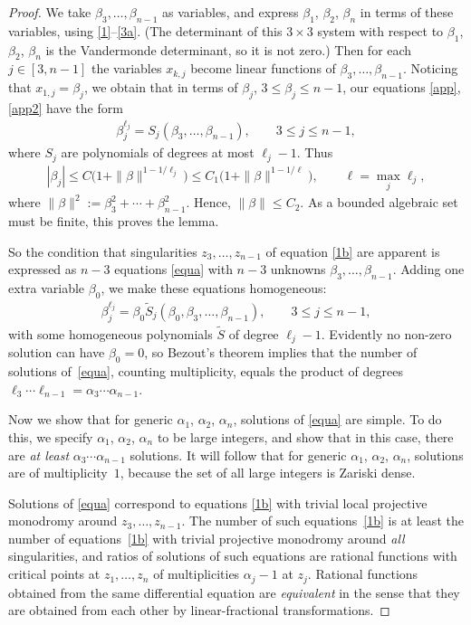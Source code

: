 \documentclass[pdftex]{sigma}
\numberwithin{equation}{section}
\def\lc{,\allowbreak\ldots,\allowbreak}
\begin{document}
\begin{proof} We take $\beta_3\lc\beta_{n-1}$ as variables, and express $\beta_1$, $\beta_2$, $\beta_n$ in terms of these variables, using \eqref{1}--\eqref{3a}. (The determinant of this $3\times3$ system with respect to $\beta_1$, $\beta_2$, $\beta_n$ is the Vandermonde determinant, so it is not zero.) Then for each $j\in[3,n-1]$ the variables $x_{k,j}$ become linear functions of $\beta_3\lc\beta_{n-1}$. Noticing that $x_{1,j}=\beta_j$, we obtain that in terms of $\beta_j$, $3\leq\beta_j\leq n-1$, our equations \eqref{app}, \eqref{app2} have the form
\begin{gather}\label{equa}
\beta_j^{\ell_j}=S_j(\beta_3\lc\beta_{n-1}),\qquad 3\leq j\leq n-1,
\end{gather}
where $S_j$ are polynomials of degrees at most $\ell_j-1$. Thus
\begin{gather*}
|\beta_j|\leq C\bigl(1+\|\beta\|^{1-1/\ell_j}\bigr)\leq C_1\bigl(1+\|\beta\|^{1-1/\ell}\bigr),\qquad \ell=\max_j\ell_j,
\end{gather*}
where $\|\beta\|^2:=\beta_3^2+\cdots+\beta_{n-1}^2$. Hence, $\|\beta\|\leq C_2 $. As a bounded algebraic set must be finite, this proves the lemma.

So the condition that singularities $z_3\lc z_{n-1}$ of equation \eqref{1b} are apparent is expressed as $n-3$ equations \eqref{equa} with $n-3$ unknowns $\beta_3\lc\beta_{n-1}$. Adding one extra variable $\beta_0$, we make these equations homogeneous:
\begin{gather*}%
\beta_j^{\ell_j}=\beta_0 \widetilde S_j(\beta_0,\beta_3\lc\beta_{n-1}),\qquad 3\leq j\leq n-1,
\end{gather*}
with some homogeneous polynomials $\widetilde S$ of degree $\ell_j-1$. Evidently no non-zero solution can have $\beta_0=0$, so Bezout's theorem \cite[Chapter~IV, Section~1]{Sh} implies that the number of solutions
of~\eqref{equa}, counting multiplicity, equals the product of degrees $\ell_3\cdots\ell_{n-1}=\alpha_3\cdots\alpha_{n-1}$.

Now we show that for generic $\alpha_1$, $\alpha_2$, $\alpha_n $, solutions of \eqref{equa} are simple. To do this, we specify $\alpha_1$, $\alpha_2$, $\alpha_n$ to be large integers, and show that in this case, there are {\em at least} $\alpha_3\cdots\alpha_{n-1}$ solutions. It will follow that for generic $\alpha_1$, $\alpha_2$, $\alpha_n $, solutions are of multiplicity~$1$, because the set of all large integers is Zariski dense.

Solutions of \eqref{equa} correspond to equations \eqref{1b} with trivial local projective monodromy around $z_3\lc z_{n-1}$. The number of such equa\-tions~\eqref{1b} is at least the number of equations~\eqref{1b} with trivial projective monodromy around {\em all} singularities, and ratios of solutions of such equations are rational functions with critical points at $z_1\lc z_n$ of multiplicities $\alpha_j-1$ at $z_j$. Rational functions obtained from the same differential equation are {\em equivalent} in the sense that they are obtained from each other by linear-fractional transformations.
\end{proof}
\end{document}
